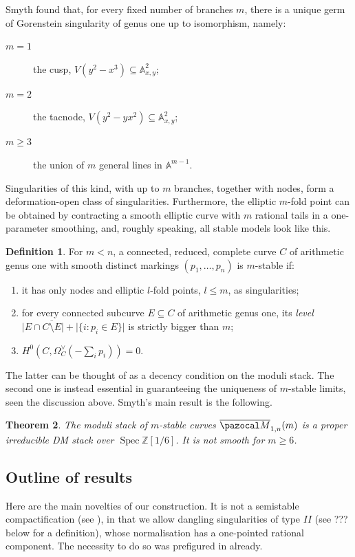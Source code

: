 \documentclass[11pt]{amsart}
\newcommand{\Aaff}{\mathbb A}
\newcommand{\oM}{\overline{\pazocal M}}
\theoremstyle{plain}
\newtheorem{thm}{Theorem}[section]
\theoremstyle{definition}
\newtheorem{dfn}[thm]{Definition}
\begin{document}
Smyth found that, for every fixed number of branches $m$, there is a unique germ of Gorenstein singularity of genus one up to isomorphism, namely:
\begin{description}
 \item[$m=1$] the cusp, $V(y^2-x^3)\subseteq\Aaff^2_{x,y}$;
 \item[$m=2$] the tacnode, $V(y^2-yx^2)\subseteq\Aaff^2_{x,y}$;
 \item[$m\geq 3$] the union of $m$ general lines in $\Aaff^{m-1}$.
\end{description}
Singularities of this kind, with up to $m$ branches, together with nodes, form a deformation-open class of singularities. Furthermore, the elliptic $m$-fold point can be obtained by contracting a smooth elliptic curve with $m$ rational tails in a one-parameter smoothing, and, roughly speaking, all stable models look like this.
\begin{dfn}\cite{SMY1}
 For $m<n$, a connected, reduced, complete curve $C$ of arithmetic genus one with smooth distinct markings $(p_1,\ldots,p_n)$ is $m$-stable if:
 \begin{enumerate}
  \item it has only nodes and elliptic $l$-fold points, $l\leq m$, as singularities;
  \item for every connected subcurve $E\subseteq C$ of arithmetic genus one, its \emph{level} $\lvert E\cap\overline{C\setminus E}\rvert+\lvert\{i\colon p_i\in E\}\rvert$ is strictly bigger than $m$;
  \item $H^0(C,\Omega_C^\vee(-\sum_i p_i))=0$.
 \end{enumerate}
\end{dfn}
The latter can be thought of as a decency condition on the moduli stack. The second one is instead essential in guaranteeing the uniqueness of $m$-stable limits, seen the discussion above. Smyth's main result is the following.
\begin{thm}\cite{SMY1,SMY2}
 The moduli stack of $m$-stable curves $\oM_{1,n}(m)$ is a proper irreducible DM stack over $\operatorname{Spec}\mathbb Z[1/6]$. It is not smooth for $m\geq 6$.
\end{thm}

\subsection{Outline of results}
Here are the main novelties of our construction. It is not a semistable compactification (see \cite[Definition 1.2]{SMY-towards}), in that we allow dangling singularities of type $I\!I$ (see ??? below for a definition), whose normalisation has a one-pointed rational component. The necessity to do so was prefigured in \cite{AFSGm} already.
\end{document}
